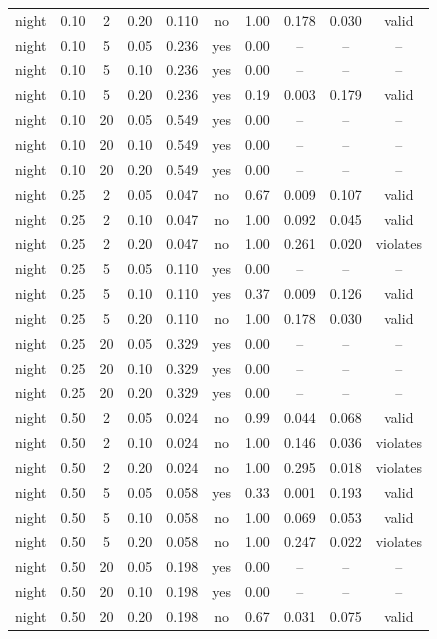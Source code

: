 \begin{table}[t]
\begin{tabular}{lccccccccc}
night & 0.10 & 2 & 0.20 & 0.110 & no & 1.00 & 0.178 & 0.030 & valid \\
night & 0.10 & 5 & 0.05 & 0.236 & yes & 0.00 & -- & -- & -- \\
night & 0.10 & 5 & 0.10 & 0.236 & yes & 0.00 & -- & -- & -- \\
night & 0.10 & 5 & 0.20 & 0.236 & yes & 0.19 & 0.003 & 0.179 & valid \\
night & 0.10 & 20 & 0.05 & 0.549 & yes & 0.00 & -- & -- & -- \\
night & 0.10 & 20 & 0.10 & 0.549 & yes & 0.00 & -- & -- & -- \\
night & 0.10 & 20 & 0.20 & 0.549 & yes & 0.00 & -- & -- & -- \\
night & 0.25 & 2 & 0.05 & 0.047 & no & 0.67 & 0.009 & 0.107 & valid \\
night & 0.25 & 2 & 0.10 & 0.047 & no & 1.00 & 0.092 & 0.045 & valid \\
night & 0.25 & 2 & 0.20 & 0.047 & no & 1.00 & 0.261 & 0.020 & violates \\
night & 0.25 & 5 & 0.05 & 0.110 & yes & 0.00 & -- & -- & -- \\
night & 0.25 & 5 & 0.10 & 0.110 & yes & 0.37 & 0.009 & 0.126 & valid \\
night & 0.25 & 5 & 0.20 & 0.110 & no & 1.00 & 0.178 & 0.030 & valid \\
night & 0.25 & 20 & 0.05 & 0.329 & yes & 0.00 & -- & -- & -- \\
night & 0.25 & 20 & 0.10 & 0.329 & yes & 0.00 & -- & -- & -- \\
night & 0.25 & 20 & 0.20 & 0.329 & yes & 0.00 & -- & -- & -- \\
night & 0.50 & 2 & 0.05 & 0.024 & no & 0.99 & 0.044 & 0.068 & valid \\
night & 0.50 & 2 & 0.10 & 0.024 & no & 1.00 & 0.146 & 0.036 & violates \\
night & 0.50 & 2 & 0.20 & 0.024 & no & 1.00 & 0.295 & 0.018 & violates \\
night & 0.50 & 5 & 0.05 & 0.058 & yes & 0.33 & 0.001 & 0.193 & valid \\
night & 0.50 & 5 & 0.10 & 0.058 & no & 1.00 & 0.069 & 0.053 & valid \\
night & 0.50 & 5 & 0.20 & 0.058 & no & 1.00 & 0.247 & 0.022 & violates \\
night & 0.50 & 20 & 0.05 & 0.198 & yes & 0.00 & -- & -- & -- \\
night & 0.50 & 20 & 0.10 & 0.198 & yes & 0.00 & -- & -- & -- \\
night & 0.50 & 20 & 0.20 & 0.198 & no & 0.67 & 0.031 & 0.075 & valid \\

\end{tabular}
\end{table}

